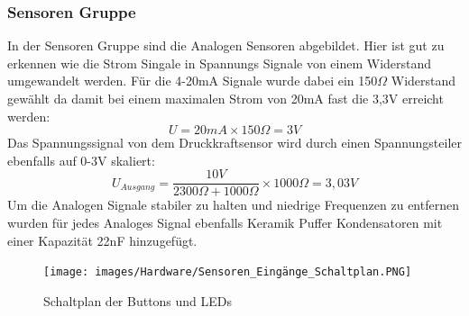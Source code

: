 \subsubsection{Sensoren Gruppe}
In der Sensoren Gruppe sind die Analogen Sensoren abgebildet. Hier ist gut zu erkennen wie die Strom Singale in Spannungs Signale von einem Widerstand umgewandelt werden. Für die 4-20mA Signale wurde dabei ein 150$\Omega$ Widerstand gewählt da damit bei einem maximalen Strom von 20mA fast die 3,3V erreicht werden:
\begin{equation}
	U = 20mA\times150\Omega = 3V
\end{equation}
Das Spannungssignal von dem Druckkraftsensor wird durch einen Spannungsteiler ebenfalls auf 0-3V skaliert:
\begin{equation}
	U_{Ausgang} = \frac{10V}{2300\Omega + 1000\Omega}\times1000\Omega = 3,03V
\end{equation}
Um die Analogen Signale stabiler zu halten und niedrige Frequenzen zu entfernen wurden für jedes Analoges Signal ebenfalls Keramik Puffer Kondensatoren mit einer Kapazität 22nF hinzugefügt.
\begin{figure}[H]
	\centering
	\texttt{[image: images/Hardware/Sensoren\_Eingänge\_Schaltplan.PNG]}
		\caption{Schaltplan der Buttons und LEDs}
	\label{fig:Sensoren_Gruppe}
\end{figure}
